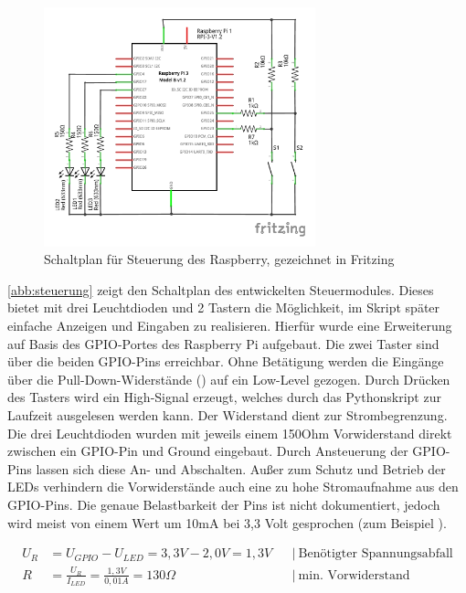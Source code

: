 \documentclass[a4paper,12pt,bibliography=totoc, listof=totoc,titlepage,pointlessnumbers]{scrreprt}
\begin{document}
\begin{figure}[ht!]
 \centering
 \includegraphics[width=0.7\textwidth]{img/steuerung.pdf}
 \caption{Schaltplan für Steuerung des Raspberry, gezeichnet in Fritzing}
 \label{abb:steuerung}
\end{figure}

\autoref{abb:steuerung} zeigt den Schaltplan des entwickelten Steuermodules. Dieses bietet mit drei Leuchtdioden und 2 Tastern die Möglichkeit, im Skript später einfache Anzeigen und Eingaben zu realisieren. Hierfür wurde eine Erweiterung auf Basis des GPIO-Portes des Raspberry Pi aufgebaut. Die zwei Taster sind über die beiden GPIO-Pins  erreichbar. Ohne Betätigung werden die Eingänge über die Pull-Down-Widerstände () auf ein Low-Level gezogen. Durch Drücken des Tasters wird ein High-Signal erzeugt, welches durch das Pythonskript zur Laufzeit ausgelesen werden kann. Der Widerstand  dient zur Strombegrenzung.
Die drei Leuchtdioden wurden mit jeweils einem 150Ohm Vorwiderstand direkt zwischen ein GPIO-Pin und Ground eingebaut. Durch Ansteuerung der GPIO-Pins lassen sich diese An- und Abschalten. Außer zum Schutz und Betrieb der LEDs verhindern die Vorwiderstände auch eine zu hohe Stromaufnahme aus den GPIO-Pins. Die genaue Belastbarkeit der Pins ist nicht dokumentiert, jedoch wird meist von einem Wert um 10mA bei 3,3 Volt gesprochen (zum Beispiel \citet{ekRaspPin}).

\begin{equation}
\begin{aligned}
U_R &= U_{GPIO} - U_{LED} = 3,3V - 2,0V = 1,3V    && \left|\  \text{Benötigter Spannungsabfall} \right. \\
R &= \frac{U_R}{I_{LED}} = \frac{1,3V}{0,01A} = 130\Omega   && \left|\  \text{min. Vorwiderstand} \right. \\
\end{aligned}
\label{eq:vorwiderstand}
\end{equation}
\end{document}

